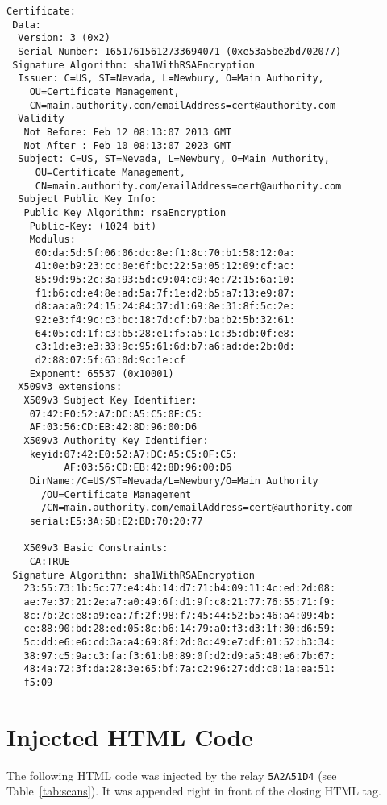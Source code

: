 \documentclass[letterpaper,twocolumn,10pt]{article}
\begin{document}
\begin{lstlisting}[basicstyle=\scriptsize\ttfamily]
Certificate:
 Data:
  Version: 3 (0x2)
  Serial Number: 16517615612733694071 (0xe53a5be2bd702077)
 Signature Algorithm: sha1WithRSAEncryption
  Issuer: C=US, ST=Nevada, L=Newbury, O=Main Authority,
    OU=Certificate Management,
    CN=main.authority.com/emailAddress=cert@authority.com
  Validity
   Not Before: Feb 12 08:13:07 2013 GMT
   Not After : Feb 10 08:13:07 2023 GMT
  Subject: C=US, ST=Nevada, L=Newbury, O=Main Authority,
     OU=Certificate Management,
     CN=main.authority.com/emailAddress=cert@authority.com
  Subject Public Key Info:
   Public Key Algorithm: rsaEncryption
    Public-Key: (1024 bit)
    Modulus:
     00:da:5d:5f:06:06:dc:8e:f1:8c:70:b1:58:12:0a:
     41:0e:b9:23:cc:0e:6f:bc:22:5a:05:12:09:cf:ac:
     85:9d:95:2c:3a:93:5d:c9:04:c9:4e:72:15:6a:10:
     f1:b6:cd:e4:8e:ad:5a:7f:1e:d2:b5:a7:13:e9:87:
     d8:aa:a0:24:15:24:84:37:d1:69:8e:31:8f:5c:2e:
     92:e3:f4:9c:c3:bc:18:7d:cf:b7:ba:b2:5b:32:61:
     64:05:cd:1f:c3:b5:28:e1:f5:a5:1c:35:db:0f:e8:
     c3:1d:e3:e3:33:9c:95:61:6d:b7:a6:ad:de:2b:0d:
     d2:88:07:5f:63:0d:9c:1e:cf
    Exponent: 65537 (0x10001)
  X509v3 extensions:
   X509v3 Subject Key Identifier: 
    07:42:E0:52:A7:DC:A5:C5:0F:C5:
    AF:03:56:CD:EB:42:8D:96:00:D6
   X509v3 Authority Key Identifier: 
    keyid:07:42:E0:52:A7:DC:A5:C5:0F:C5:
          AF:03:56:CD:EB:42:8D:96:00:D6
    DirName:/C=US/ST=Nevada/L=Newbury/O=Main Authority
      /OU=Certificate Management
      /CN=main.authority.com/emailAddress=cert@authority.com
    serial:E5:3A:5B:E2:BD:70:20:77

   X509v3 Basic Constraints: 
    CA:TRUE
 Signature Algorithm: sha1WithRSAEncryption
   23:55:73:1b:5c:77:e4:4b:14:d7:71:b4:09:11:4c:ed:2d:08:
   ae:7e:37:21:2e:a7:a0:49:6f:d1:9f:c8:21:77:76:55:71:f9:
   8c:7b:2c:e8:a9:ea:7f:2f:98:f7:45:44:52:b5:46:a4:09:4b:
   ce:88:90:bd:28:ed:05:8c:b6:14:79:a0:f3:d3:1f:30:d6:59:
   5c:dd:e6:e6:cd:3a:a4:69:8f:2d:0c:49:e7:df:01:52:b3:34:
   38:97:c5:9a:c3:fa:f3:61:b8:89:0f:d2:d9:a5:48:e6:7b:67:
   48:4a:72:3f:da:28:3e:65:bf:7a:c2:96:27:dd:c0:1a:ea:51:
   f5:09
\end{lstlisting}

\section{Injected HTML Code}
\label{app:injected_html}
The following HTML code was injected by the relay \texttt{5A2A51D4} (see Table~\ref{tab:scans}).  It
was appended right in front of the closing HTML tag.
\end{document}
